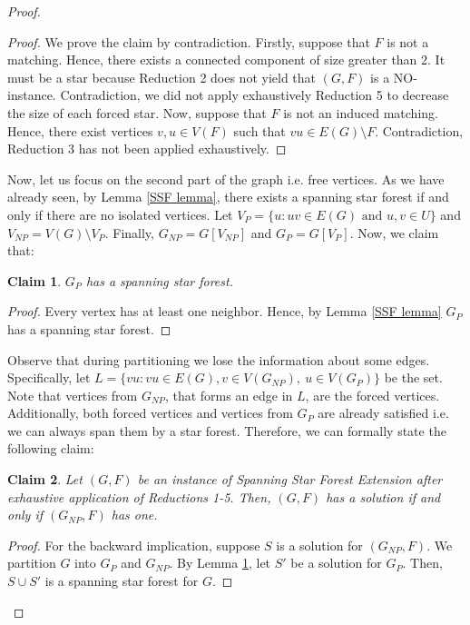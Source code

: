 \documentclass[en]{pracamgr}
\newtheorem{claim}{Claim}
\theoremstyle{definition}
\newcommand{\ssf}{spanning star forest}
\newcommand{\ssfep}{{\sc Spanning Star Forest Extension}}
\begin{document}
\begin{proof}
	\begin{proof}
		We prove the claim by contradiction. Firstly, suppose that $F$ is not a matching. Hence, there exists a connected component of size greater than $2$. It must be a star because Reduction 2 does not yield that $(G,F)$ is a NO-instance. Contradiction, we did not apply exhaustively Reduction 5 to decrease the size of each forced star. Now, suppose that $F$ is not an induced matching. Hence, there exist vertices $v,u \in V(F)$ such that $vu \in E(G) \setminus F$. Contradiction, Reduction 3 has not been applied exhaustively.
	\end{proof}

	Now, let us focus on the second part of the graph i.e. free vertices. As we have already seen, by Lemma \ref{SSF lemma}, there exists a spanning star forest if and only if there are no isolated vertices. Let $V_P = \{u: uv \in E(G) \text{ and } u,v \in U\}$ and $V_{NP} = V(G) \setminus V_P$. Finally, $G_{NP} = G[V_{NP}]$ and $G_P = G[V_P]$. Now, we claim that:

	\begin{claim}\label{GP partition}
		$G_P$ has a spanning star forest.
	\end{claim}
	
	\begin{proof}
		Every vertex has at least one neighbor. Hence, by Lemma \ref{SSF lemma} $G_P$ has a spanning star forest.
	\end{proof}

	Observe that during partitioning we lose the information about some edges. Specifically, let $L= \{vu: vu \in E(G), v \in V(G_{NP}),\ u \in V(G_P)\}$ be the set. Note that vertices from $G_{NP}$, that forms an edge in $L$, are the forced vertices. Additionally, both forced vertices and vertices from $G_P$ are already satisfied i.e. we can always span them by a star forest. Therefore, we can formally state the following claim:
	
	\begin{claim}\label{GNP partition}
		Let $(G,F)$ be an instance of \ssfep{} after exhaustive application of Reductions 1-5. Then, $(G,F)$ has a solution if and only if $(G_{NP},F)$ has one.
	\end{claim}

	\begin{proof}
		For the backward implication, suppose $S$ is a solution for $(G_{NP},F)$. We  partition $G$ into $G_P$ and $G_{NP}$. By Lemma \ref{GP partition}, let $S'$ be a solution for $G_P$. Then, $S \cup S'$ is a \ssf{} for $G$.
		

\end{proof}
\end{proof}
\end{document}
